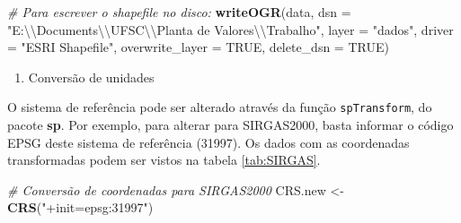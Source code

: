 \documentclass[]{article}
\newenvironment{Shaded}{\begin{snugshade}}{\end{snugshade}}
\newcommand{\KeywordTok}[1]{\textcolor[rgb]{0.13,0.29,0.53}{\textbf{#1}}}
\newcommand{\DataTypeTok}[1]{\textcolor[rgb]{0.13,0.29,0.53}{#1}}
\newcommand{\CharTok}[1]{\textcolor[rgb]{0.31,0.60,0.02}{#1}}
\newcommand{\StringTok}[1]{\textcolor[rgb]{0.31,0.60,0.02}{#1}}
\newcommand{\CommentTok}[1]{\textcolor[rgb]{0.56,0.35,0.01}{\textit{#1}}}
\newcommand{\OtherTok}[1]{\textcolor[rgb]{0.56,0.35,0.01}{#1}}
\newcommand{\NormalTok}[1]{#1}
\providecommand{\tightlist}{%
  \setlength{\itemsep}{0pt}\setlength{\parskip}{0pt}}
\newcommand{\pkg}[1]{\textbf{#1}}
\let\code=\texttt
\begin{document}
\begin{Shaded}
\begin{Highlighting}[]
\CommentTok{# Para escrever o shapefile no disco:  }
 \KeywordTok{writeOGR}\NormalTok{(data, }
          \DataTypeTok{dsn =} \StringTok{"E:}\CharTok{\textbackslash{}\textbackslash{}}\StringTok{Documents}\CharTok{\textbackslash{}\textbackslash{}}\StringTok{UFSC}\CharTok{\textbackslash{}\textbackslash{}}\StringTok{Planta de Valores}\CharTok{\textbackslash{}\textbackslash{}}\StringTok{Trabalho"}\NormalTok{, }
          \DataTypeTok{layer =} \StringTok{"dados"}\NormalTok{,}
          \DataTypeTok{driver =} \StringTok{"ESRI Shapefile"}\NormalTok{,}
          \DataTypeTok{overwrite_layer =} \OtherTok{TRUE}\NormalTok{,}
          \DataTypeTok{delete_dsn =} \OtherTok{TRUE}\NormalTok{)}
\end{Highlighting}
\end{Shaded}

\begin{enumerate}
\def\labelenumi{\alph{enumi}.}
\setcounter{enumi}{2}
\tightlist
\item
  Conversão de unidades
\end{enumerate}

O sistema de referência pode ser alterado através da função
\code{spTransform}, do pacote \pkg{sp}. Por exemplo, para alterar para
SIRGAS2000, basta informar o código EPSG deste sistema de referência
(31997). Os dados com as coordenadas transformadas podem ser vistos na
tabela \ref{tab:SIRGAS}.

\begin{Shaded}
\begin{Highlighting}[]
\CommentTok{# Conversão de coordenadas para SIRGAS2000}
\NormalTok{CRS.new <-}\StringTok{ }\KeywordTok{CRS}\NormalTok{(}\StringTok{"+init=epsg:31997"}\NormalTok{)}
\end{Highlighting}
\end{Shaded}
\end{document}
